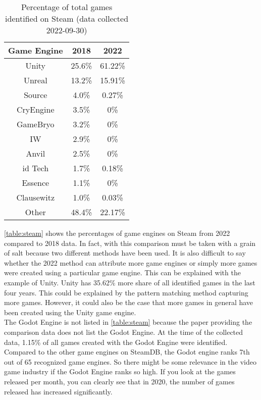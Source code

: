 \begin{table}[h!]
    \centering
    \begin{tabular}{|c c c|}
        \hline
        Game Engine & 2018   & 2022    \\
        \hline\hline
        Unity       & 25.6\% & 61.22\% \\
        Unreal      & 13.2\% & 15.91\% \\
        Source      & 4.0\%  & 0.27\%  \\
        CryEngine   & 3.5\%  & 0\%     \\
        GameBryo    & 3.2\%  & 0\%     \\
        IW          & 2.9\%  & 0\%     \\
        Anvil       & 2.5\%  & 0\%     \\
        id Tech     & 1.7\%  & 0.18\%  \\
        Essence     & 1.1\%  & 0\%     \\
        Clausewitz  & 1.0\%  & 0.03\%  \\
        Other       & 48.4\% & 22.17\% \\
        \hline
    \end{tabular}
    \caption{Percentage of total games identified on Steam (data collected 2022-09-30)}
    \label{table:steam}
\end{table}

\autoref{table:steam} shows the percentages of game engines on Steam from 2022 compared to 2018 data.
In fact, with this comparison must be taken with a grain of salt because two different methods have been used.
It is also difficult to say whether the 2022 method can attribute more game engines or simply more games were created using a particular game engine.
This can be explained with the example of Unity.
Unity has 35.62\% more share of all identified games in the last four years.
This could be explained by the pattern matching method capturing more games.
However, it could also be the case that more games in general have been created using the Unity game engine. \\


The Godot Engine is not listed in \autoref{table:steam} because the paper providing the comparison data does not list the Godot Engine.
At the time of the collected data, 1.15\% of all games created with the Godot Engine were identified.
Compared to the other game engines on SteamDB, the Godot engine ranks 7th out of 65 recognized game engines.
So there might be some relevance in the video game industry if the Godot Engine ranks so high.
If you look at the games released per month, you can clearly see that in 2020, the number of games released has increased significantly.\\

